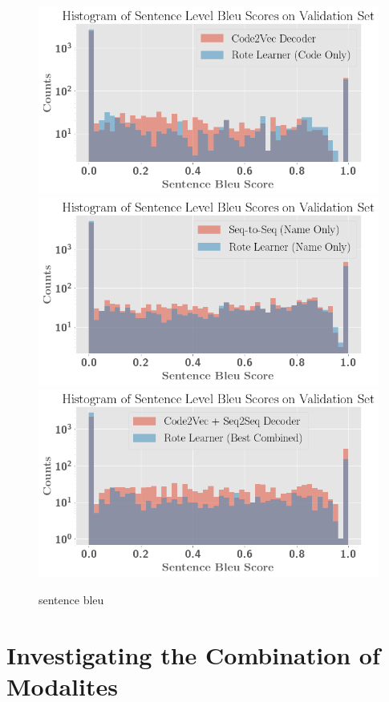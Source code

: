 \begin{figure}
\begin{center}
\includegraphics[width=0.75\linewidth]{ImagesCodeRelated/pretty_sentence_c2v.png}
\includegraphics[width=.75\linewidth]{ImagesCodeRelated/pretty_sentence_bleu_s2s.png}
\includegraphics[width=.75\linewidth]{ImagesCodeRelated/pretty_sentence_bleu_c2e.png}
\end{center}
\caption{sentence bleu}
\label{fig:sentence_bleu}

\end{figure}



\section{Investigating the Combination of Modalites} %
\label{sec:investigating_combined_channels}



